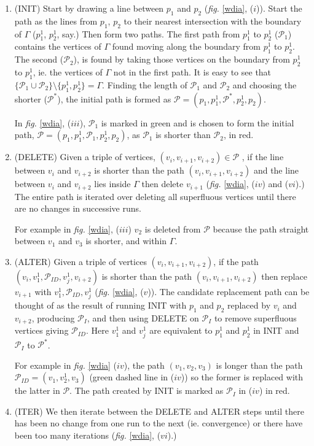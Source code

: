 \documentclass[a4paper,10pt]{article}
\newcommand{\fig}[1]{\emph{fig.} \ref{#1}}
\begin{document}
\begin{enumerate}
\item (INIT) Start by drawing a line between $p_1$ and $p_2$ (\fig{wdia}, ($i$)). Start the path as the lines from $p_1$, $p_2$ to their nearest intersection with the boundary of $\Gamma$ ($p_1^1$, $p_2^1$, say.) Then form two paths. The first path from $p_1^1$ to $p_2^1$ ($\mathcal{P}_1$) contains the vertices of $\Gamma$ found moving along the boundary from $p_1^1$ to $p_2^1$. The second ($\mathcal{P}_2$), is found by taking those vertices on the boundary from $p_2^1$ to $p_1^1$, ie. the vertices of $\Gamma$ not in the first path. It is easy to see that $\{\mathcal{P}_1 \cup \mathcal{P}_2\} \setminus \{p_1^1, p_2^1\} = \Gamma$. Finding the length of $\mathcal{P}_1$ and $\mathcal{P}_2$ and choosing the shorter ($\mathcal{P^*}$), the initial path is formed as $\mathcal{P}=(p_1,p_1^1,\mathcal{P}^*,p_2^1,p_2)$. 

In \fig{wdia}, ($iii$), $\mathcal{P}_1$ is marked in green and is chosen to form the initial path, $\mathcal{P}=(p_1,p_1^1,\mathcal{P}_1,p_2^1,p_2)$, as $\mathcal{P}_1$ is shorter than $\mathcal{P}_2$, in red.

\item (DELETE) Given a triple of vertices, $(v_i, v_{i+1}, v_{i+2}) \in \mathcal{P}$ , if the line between $v_i$ and $v_{i+2}$ is shorter than the path $(v_i, v_{i+1}, v_{i+2})$ and the line between $v_i$ and $v_{i+2}$ lies inside $\Gamma$ then delete $v_{i+1}$ (\fig{wdia}, ($iv$) and ($vi$).) The entire path is iterated over deleting all superfluous vertices until there are no changes in successive runs. 

For example in \fig{wdia}, ($iii$) $v_2$ is deleted from $\mathcal{P}$ because the path straight between $v_1$ and $v_3$ is shorter, and within $\Gamma$.

\item (ALTER) Given a triple of vertices $(v_i, v_{i+1}, v_{i+2})$, if the path $(v_i, v^1_1, \mathcal{P}_{ID}, v^1_j, v_{i+2})$ is shorter than the path $(v_i, v_{i+1}, v_{i+2})$ then replace $v_{i+1}$ with $v^1_1, \mathcal{P}_{ID}, v^1_j$ (\fig{wdia}, ($v$)). The candidate replacement path can be thought of as the result of running INIT with $p_1$ and $p_2$ replaced by $v_i$ and $v_{i+2}$, producing $\mathcal{P}_I$, and then using DELETE on $\mathcal{P}_I$ to remove superfluous vertices giving $\mathcal{P}_{ID}$. Here $v^1_1$ and $v^1_j$ are equivalent to $p_1^1$ and $p_2^1$ in INIT and $\mathcal{P}_I$ to $\mathcal{P}^*$.

For example in \fig{wdia} ($iv$), the path $(v_1, v_2, v_3)$ is longer than the path $\mathcal{P}_{ID}=(v_1, v^1_2, v_3)$ (green dashed line in ($iv$)) so the former is replaced with the latter in $\mathcal{P}$. The path created by INIT is marked as $\mathcal{P}_{I}$ in  ($iv$) in red.

\item (ITER) We then iterate between the DELETE and ALTER steps until there has been no change from one run to the next (ie. convergence) or there have been too many iterations (\fig{wdia}, ($vi$).)
\end{enumerate}
\end{document}

